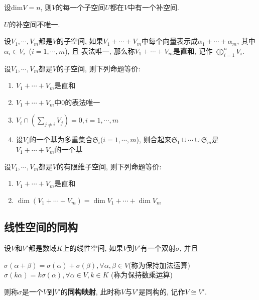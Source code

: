\begin{Proposition}
设$\text{dim}V = n$, 则$V$的每一个子空间$U$都在$V$中有一个补空间.
\end{Proposition}

\begin{Remark}
$U$的补空间不唯一.
\end{Remark}

\begin{Definition}
设$V_1, \cdots, V_m$都是$V$的子空间, 如果$V_1 + \cdots + V_m$中每个向量表示成$\alpha_1 + \cdots + \alpha_m$, 其中$\alpha_i \in V_i$~($i = 1, \cdots, m$), 且
表法唯一, 那么称$V_1 + \cdots + V_m$是\textbf{直和}, 记作
$ %
\bigoplus_{i=1}^n V_i
$.
\end{Definition}

\begin{Theorem}
设$V_1, \cdots, V_m$都是$V$的子空间, 则下列命题等价:
\begin{enumerate}[(1)]
\item $V_1 + \cdots + V_m$是直和
\item $V_1 + \cdots + V_m$中$0$的表法唯一
\item $\displaystyle V_i \cap (\sum_{j \neq i} V_j) = 0, i = 1, \cdots, m$ %
\item 设$V_i$的一个基为多重集合$\mathfrak{S}_i$\;($i = 1, \cdots, m$), 则合起来$\mathfrak{S}_1 \cup \cdots \cup \mathfrak{S}_m$是$V_1 + \cdots + V_m$的一个基
\end{enumerate}
\end{Theorem}

\begin{Theorem}
设$V_1, \cdots, V_m$都是$V$的有限维子空间, 则下列命题等价:
\begin{enumerate}[(1)]
\item $V_1 + \cdots + V_m$是直和
\item $\dim {(V_1 + \cdots + V_m)} = \dim V_1 + \cdots + \dim V_m$
\end{enumerate}
\end{Theorem}

\subsection{线性空间的同构}

\begin{Definition}[线性空间的同构]
设$V$和$V'$都是数域$K$上的线性空间, 如果$V$到$V'$有一个双射$\sigma$, 并且
\begin{tightcenter}
$\sigma(\alpha + \beta) = \sigma(\alpha) + \sigma(\beta), \forall \alpha, \beta \in V$(称为保持加法运算) \\
$\sigma(k \alpha) = k \sigma(\alpha), \forall \alpha \in V, k \in K$ (称为保持数乘运算)
\end{tightcenter}
则称$\sigma$是一个$V$到$V'$的\textbf{同构映射}, 此时称$V$与$V'$是同构的, 记作$V \cong V'$.
\end{Definition}

